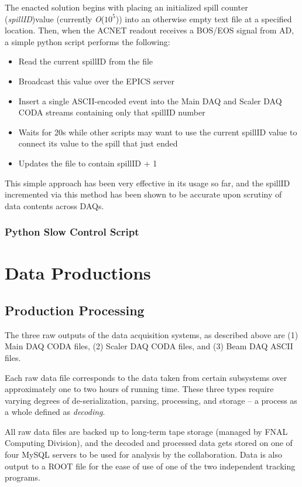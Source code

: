 The enacted solution begins with placing an initialized spill counter (\emph{spillID})value (currently \emph{O}($10^5$)) into an otherwise empty text file at a specified location. Then, when the ACNET readout receives a BOS/EOS signal from AD, a simple python script performs the following:
\begin{itemize}
	\item Read the current spillID from the file
	\item Broadcast this value over the EPICS server
	\item Insert a single ASCII-encoded event into the Main DAQ and Scaler DAQ CODA streams containing only that spillID number
	\item Waits for 20s while other scripts may want to use the current spillID value to connect its value to the spill that just ended
	\item Updates the file to contain spillID + 1
\end{itemize}

This simple approach has been very effective in its usage so far, and the spillID incremented via this method has been shown to be accurate upon scrutiny of data contents across DAQs.

\subsubsection{Python Slow Control Script}



\section{Data Productions}

\subsection{Production Processing}

The three raw outputs of the data acquisition systems, as described above are (1) Main DAQ CODA files, (2) Scaler DAQ CODA files, and (3) Beam DAQ ASCII files.

Each raw data file corresponds to the data taken from certain subsystems over approximately one to two hours of running time. These three types require varying degrees of de-serialization, parsing, processing, and storage -- a process as a whole defined as \emph{decoding}. 

All raw data files are backed up to long-term tape storage (managed by FNAL Computing Division), and the decoded and processed data gets stored on one of four MySQL servers to be used for analysis by the collaboration. Data is also output to a ROOT file for the ease of use of one of the two independent tracking programs.

